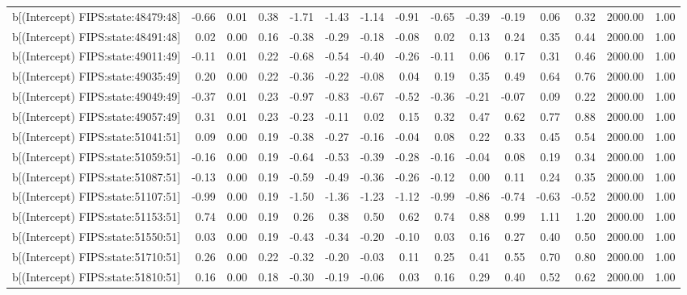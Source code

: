 \begin{table}[ht]
\begin{tabular}{rrrrrrrrrrrrrrr}
  b[(Intercept) FIPS:state:48479:48] & -0.66 & 0.01 & 0.38 & -1.71 & -1.43 & -1.14 & -0.91 & -0.65 & -0.39 & -0.19 & 0.06 & 0.32 & 2000.00 & 1.00 \\ 
  b[(Intercept) FIPS:state:48491:48] & 0.02 & 0.00 & 0.16 & -0.38 & -0.29 & -0.18 & -0.08 & 0.02 & 0.13 & 0.24 & 0.35 & 0.44 & 2000.00 & 1.00 \\ 
  b[(Intercept) FIPS:state:49011:49] & -0.11 & 0.01 & 0.22 & -0.68 & -0.54 & -0.40 & -0.26 & -0.11 & 0.06 & 0.17 & 0.31 & 0.46 & 2000.00 & 1.00 \\ 
  b[(Intercept) FIPS:state:49035:49] & 0.20 & 0.00 & 0.22 & -0.36 & -0.22 & -0.08 & 0.04 & 0.19 & 0.35 & 0.49 & 0.64 & 0.76 & 2000.00 & 1.00 \\ 
  b[(Intercept) FIPS:state:49049:49] & -0.37 & 0.01 & 0.23 & -0.97 & -0.83 & -0.67 & -0.52 & -0.36 & -0.21 & -0.07 & 0.09 & 0.22 & 2000.00 & 1.00 \\ 
  b[(Intercept) FIPS:state:49057:49] & 0.31 & 0.01 & 0.23 & -0.23 & -0.11 & 0.02 & 0.15 & 0.32 & 0.47 & 0.62 & 0.77 & 0.88 & 2000.00 & 1.00 \\ 
  b[(Intercept) FIPS:state:51041:51] & 0.09 & 0.00 & 0.19 & -0.38 & -0.27 & -0.16 & -0.04 & 0.08 & 0.22 & 0.33 & 0.45 & 0.54 & 2000.00 & 1.00 \\ 
  b[(Intercept) FIPS:state:51059:51] & -0.16 & 0.00 & 0.19 & -0.64 & -0.53 & -0.39 & -0.28 & -0.16 & -0.04 & 0.08 & 0.19 & 0.34 & 2000.00 & 1.00 \\ 
  b[(Intercept) FIPS:state:51087:51] & -0.13 & 0.00 & 0.19 & -0.59 & -0.49 & -0.36 & -0.26 & -0.12 & 0.00 & 0.11 & 0.24 & 0.35 & 2000.00 & 1.00 \\ 
  b[(Intercept) FIPS:state:51107:51] & -0.99 & 0.00 & 0.19 & -1.50 & -1.36 & -1.23 & -1.12 & -0.99 & -0.86 & -0.74 & -0.63 & -0.52 & 2000.00 & 1.00 \\ 
  b[(Intercept) FIPS:state:51153:51] & 0.74 & 0.00 & 0.19 & 0.26 & 0.38 & 0.50 & 0.62 & 0.74 & 0.88 & 0.99 & 1.11 & 1.20 & 2000.00 & 1.00 \\ 
  b[(Intercept) FIPS:state:51550:51] & 0.03 & 0.00 & 0.19 & -0.43 & -0.34 & -0.20 & -0.10 & 0.03 & 0.16 & 0.27 & 0.40 & 0.50 & 2000.00 & 1.00 \\ 
  b[(Intercept) FIPS:state:51710:51] & 0.26 & 0.00 & 0.22 & -0.32 & -0.20 & -0.03 & 0.11 & 0.25 & 0.41 & 0.55 & 0.70 & 0.80 & 2000.00 & 1.00 \\ 
  b[(Intercept) FIPS:state:51810:51] & 0.16 & 0.00 & 0.18 & -0.30 & -0.19 & -0.06 & 0.03 & 0.16 & 0.29 & 0.40 & 0.52 & 0.62 & 2000.00 & 1.00 \\ 

\end{tabular}
\end{table}
